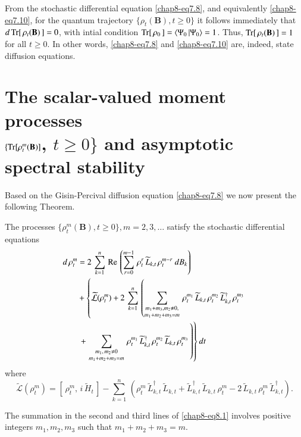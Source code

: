 From the stochastic differential equation \eqref{chap8-eq7.8}, and equivalently \eqref{chap8-eq7.10}, for the  quantum trajectory $\{\rho_t(\mathbf{B}), t\geq 0\}$ it follows immediately that  $d\, {\rm Tr}[\,\rho_t(\mathbf{B})\,]=0$, with intial condition ${\rm Tr}[\,\rho_0\,]=\langle \Psi_0\,\vert \Psi_0\rangle=1$. Thus, ${\rm Tr}[\,\rho_t (\mathbf{B})\,]=1$ for all $t\geq 0$. In other words, \eqref{chap8-eq7.8} and \eqref{chap8-eq7.10} are, indeed, state diffusion equations.   

\section{The scalar-valued  moment processes   \\ $\{{\rm Tr}[\rho_t^m(\mathbf{B})]$, $t\geq 0\}$ and  asymptotic  spectral stability} \label{chap8-eq8}

Based on the Gisin-Percival diffusion equation \eqref{chap8-eq7.8}  we now present the following Theorem. 

\begin{thm}\label{chap8-thm3}
The  processes $\{\rho_t^m(\mathbf{B}), t\geq 0\}, m=2,3,\ldots$ satisfy the stochastic differential equations   
\begin{align} 
d\, \rho_t^m &= 2\, \sum_{k=1}^{n}\,  {\rm Re}\, \left( \sum_{r=0}^{m-1}\, \rho_t^r\, \widetilde{L}_{k,t}\, \rho^{m-r}_t\ dB_{k}\right)    \nonumber \\
& +\left\{  \widetilde{\mathcal{L}}(\rho_t^m) + 2\, \sum_{k=1}^n\, \left(\mathop{\sum_{m_1+m_3, m_2\neq 0,}^{}}_{m_1+m_2+m_3=m}\,    \rho_t^{m_1}\, \widetilde{L}_{k,t}\, \rho_t^{m_2}\, \widetilde{L}_{k,t}^\dag\, \rho_t^{m_3} \right. \right. \nonumber \\ 
&\left.\left.    +   \, \mathop{\sum_{m_1,\, m_2\neq 0}^{}}_{m_1+m_2+m_3=m}\,  \rho_t^{m_1}\, \widetilde{L}^\dag_{k,t}\, \rho_t^{m_2}\, \widetilde{L}_{k,t}\, \rho_t^{m_3}\, \right) \right\} dt  \label{chap8-eq8.1}
\end{align}
where  
\begin{equation}
\widetilde{\mathcal{L}}(\rho_t^m)=\left[\,\rho_t^m,\, i\, \widetilde{H}_t\, \right]- \sum_{k=1}^n\,\left(\rho_t^m\, \widetilde{L}_{k,t}^\dag\,\widetilde{L}_{k,t} + \widetilde{L}^\dag_{k,t}\,\widetilde{L}_{k,t}\, \rho_t^m - 2\, \widetilde{L}_{k,t}\, \rho_t^m\, \widetilde{L}_{k,t}^\dag\right).\label{chap8-eq8.2}
\end{equation}
\end{thm}
The summation in the second and third lines of \eqref{chap8-eq8.1} involves positive integers $m_1,m_2,m_3$ such that $m_1+m_2+m_3=m$.   

